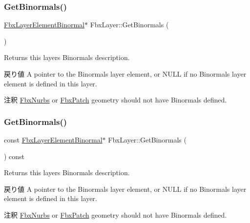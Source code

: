 \subsubsection{\texorpdfstring{Get\+Binormals()}{GetBinormals()}\hspace{0.1cm}{\footnotesize\ttfamily [1/2]}}
{\footnotesize\ttfamily \hyperlink{class_fbx_layer_element_binormal}{Fbx\+Layer\+Element\+Binormal}$\ast$ Fbx\+Layer\+::\+Get\+Binormals (\begin{DoxyParamCaption}{ }\end{DoxyParamCaption})}

Returns this layer\textquotesingle{}s Binormals description. \begin{DoxyReturn}{戻り値}
A pointer to the Binormals layer element, or {\ttfamily N\+U\+LL} if no Binormals layer element is defined in this layer. 
\end{DoxyReturn}
\begin{DoxyRemark}{注釈}
\hyperlink{class_fbx_nurbs}{Fbx\+Nurbs} or \hyperlink{class_fbx_patch}{Fbx\+Patch} geometry should not have Binormals defined. 
\end{DoxyRemark}
\mbox{\label{class_fbx_layer_a7ece190d2b12f0ca7db403e5a82d4607}} 
\subsubsection{\texorpdfstring{Get\+Binormals()}{GetBinormals()}\hspace{0.1cm}{\footnotesize\ttfamily [2/2]}}
{\footnotesize\ttfamily const \hyperlink{class_fbx_layer_element_binormal}{Fbx\+Layer\+Element\+Binormal}$\ast$ Fbx\+Layer\+::\+Get\+Binormals (\begin{DoxyParamCaption}{ }\end{DoxyParamCaption}) const}

Returns this layer\textquotesingle{}s Binormals description. \begin{DoxyReturn}{戻り値}
A pointer to the Binormals layer element, or {\ttfamily N\+U\+LL} if no Binormals layer element is defined in this layer. 
\end{DoxyReturn}
\begin{DoxyRemark}{注釈}
\hyperlink{class_fbx_nurbs}{Fbx\+Nurbs} or \hyperlink{class_fbx_patch}{Fbx\+Patch} geometry should not have Binormals defined. 
\end{DoxyRemark}
\mbox{\label{class_fbx_layer_ae2e4f8ccb8cb6ddc101bf01986b1661b}} 
